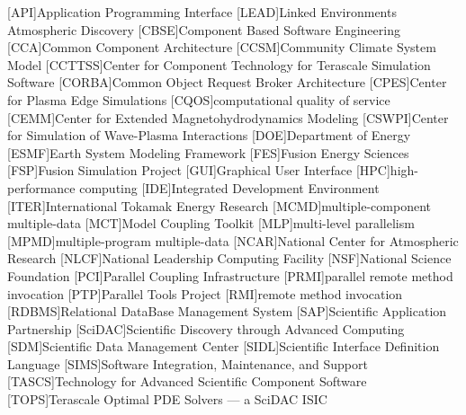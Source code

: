 

\begin{acronym}

[API]{Application Programming Interface}
[LEAD]{Linked Environments Atmospheric Discovery}
[CBSE]{Component Based Software Engineering}
[CCA]{Common Component Architecture}
[CCSM]{Community Climate System Model}
[CCTTSS]{Center for Component Technology for Terascale Simulation Software}
[CORBA]{Common Object Request Broker Architecture}
[CPES]{Center for Plasma Edge Simulations}
[CQOS]{computational quality of service}
[CEMM]{Center for Extended Magnetohydrodynamics Modeling}
[CSWPI]{Center for Simulation of Wave-Plasma Interactions}
[DOE]{Department of Energy}
[ESMF]{Earth System Modeling Framework}
[FES]{Fusion Energy Sciences}
[FSP]{Fusion Simulation Project}
[GUI]{Graphical User Interface}
[HPC]{high-performance computing}
[IDE]{Integrated Development Environment}
[ITER]{International Tokamak Energy Research}
[MCMD]{multiple-component multiple-data}
[MCT]{Model Coupling Toolkit}
[MLP]{multi-level parallelism}
[MPMD]{multiple-program multiple-data}
[NCAR]{National Center for Atmospheric Research}
[NLCF]{National Leadership Computing Facility}
[NSF]{National Science Foundation}
[PCI]{Parallel Coupling Infrastructure}
[PRMI]{parallel remote method invocation}
[PTP]{Parallel Tools Project}
[RMI]{remote method invocation}
[RDBMS]{Relational DataBase Management System}
[SAP]{Scientific Application Partnership}
[SciDAC]{Scientific Discovery through Advanced Computing}
[SDM]{Scientific Data Management Center}
[SIDL]{Scientific Interface Definition Language}
[SIMS]{Software Integration, Maintenance, and Support}
[TASCS]{Technology for Advanced Scientific Component Software}
[TOPS]{Terascale Optimal PDE Solvers --- a SciDAC ISIC}

\end{acronym}
